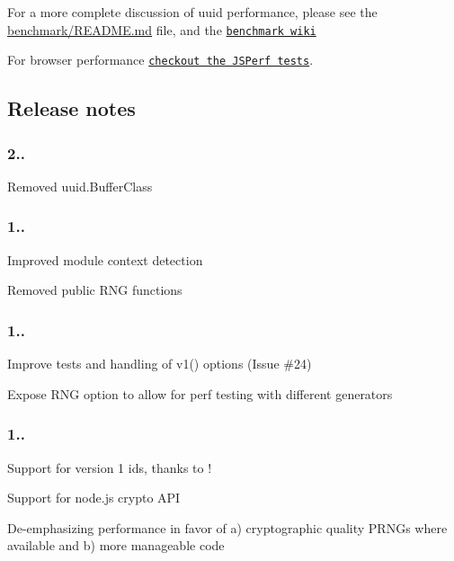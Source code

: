 For a more complete discussion of uuid performance, please see the {\ttfamily \mbox{\hyperlink{node__modules_2uuid_2benchmark_2_r_e_a_d_m_e_8md}{benchmark/\+R\+E\+A\+D\+M\+E.\+md}}} file, and the \href{https://github.com/broofa/uuid/wiki/Benchmark}{\tt benchmark wiki}

For browser performance \href{http://jsperf.com/node-uuid-performance}{\tt checkout the J\+S\+Perf tests}.

\subsection*{Release notes}

\subsubsection*{2..}


\begin{DoxyItemize}
\item Removed uuid.\+Buffer\+Class
\end{DoxyItemize}

\subsubsection*{1..}


\begin{DoxyItemize}
\item Improved module context detection
\item Removed public R\+NG functions
\end{DoxyItemize}

\subsubsection*{1..}


\begin{DoxyItemize}
\item Improve tests and handling of v1() options (Issue \#24)
\item Expose R\+NG option to allow for perf testing with different generators
\end{DoxyItemize}

\subsubsection*{1..}


\begin{DoxyItemize}
\item Support for version 1 ids, thanks to \href{https://github.com/ctavan}{\tt }!
\item Support for node.\+js crypto A\+PI
\item De-\/emphasizing performance in favor of a) cryptographic quality P\+R\+N\+Gs where available and b) more manageable code 
\end{DoxyItemize}